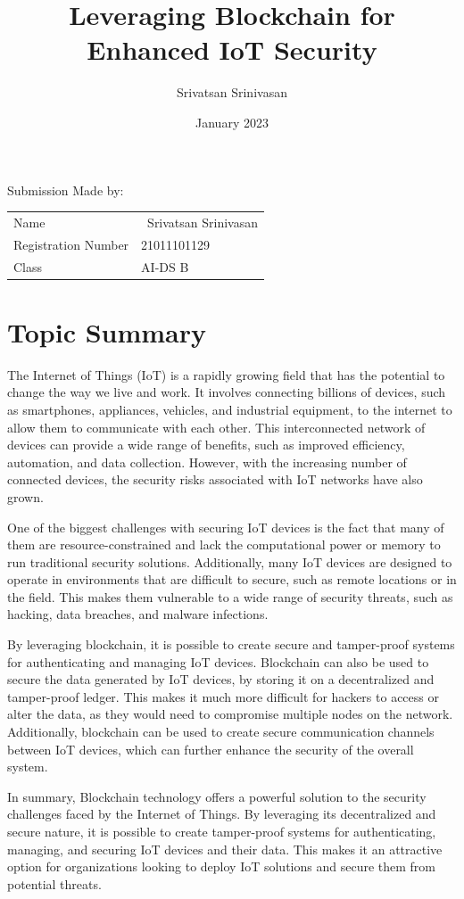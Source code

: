 \documentclass{article}
\title{Leveraging Blockchain for Enhanced IoT Security
}
\author{Srivatsan Srinivasan}
\date{January 2023}
\begin{document}
\maketitle 

\noindent
\normalsize
Submission Made by:

\begin{tabular}{@{}ll}
    Name & \ Srivatsan Srinivasan\\
     Registration Number &  21011101129\\
     Class & AI-DS B
\end{tabular}

\section*{Topic Summary}
\large The Internet of Things (IoT) is a rapidly growing field that has the potential to change the way we live and work. It involves connecting billions of devices, such as smartphones, appliances, vehicles, and industrial equipment, to the internet to allow them to communicate with each other. This interconnected network of devices can provide a wide range of benefits, such as improved efficiency, automation, and data collection. However, with the increasing number of connected devices, the security risks associated with IoT networks have also grown.

One of the biggest challenges with securing IoT devices is the fact that many of them are resource-constrained and lack the computational power or memory to run traditional security solutions. Additionally, many IoT devices are designed to operate in environments that are difficult to secure, such as remote locations or in the field. This makes them vulnerable to a wide range of security threats, such as hacking, data breaches, and malware infections.

By leveraging blockchain, it is possible to create secure and tamper-proof systems for authenticating and managing IoT devices. Blockchain can also be used to secure the data generated by IoT devices, by storing it on a decentralized and tamper-proof ledger. This makes it much more difficult for hackers to access or alter the data, as they would need to compromise multiple nodes on the network. Additionally, blockchain can be used to create secure communication channels between IoT devices, which can further enhance the security of the overall system.

In summary, Blockchain technology offers a powerful solution to the security challenges faced by the Internet of Things. By leveraging its decentralized and secure nature, it is possible to create tamper-proof systems for authenticating, managing, and securing IoT devices and their data. This makes it an attractive option for organizations looking to deploy IoT solutions and secure them from potential threats.
\end{document}
